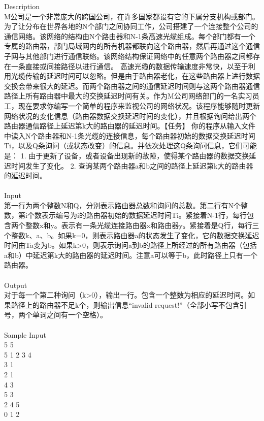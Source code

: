 Description \\
M公司是一个非常庞大的跨国公司，在许多国家都设有它的下属分支机构或部门。为了让分布在世界各地的N个部门之间协同工作，公司搭建了一个连接整个公司的通信网络。该网络的结构由N个路由器和N-1条高速光缆组成。每个部门都有一个专属的路由器，部门局域网内的所有机器都联向这个路由器，然后再通过这个通信子网与其他部门进行通信联络。该网络结构保证网络中的任意两个路由器之间都存在一条直接或间接路径以进行通信。 高速光缆的数据传输速度非常快，以至于利用光缆传输的延迟时间可以忽略。但是由于路由器老化，在这些路由器上进行数据交换会带来很大的延迟。而两个路由器之间的通信延迟时间则与这两个路由器通信路径上所有路由器中最大的交换延迟时间有关。作为M公司网络部门的一名实习员工，现在要求你编写一个简单的程序来监视公司的网络状况。该程序能够随时更新网络状况的变化信息（路由器数据交换延迟时间的变化），并且根据询问给出两个路由器通信路径上延迟第k大的路由器的延迟时间。【任务】 你的程序从输入文件中读入N个路由器和N-1条光缆的连接信息，每个路由器初始的数据交换延迟时间Ti，以及Q条询问（或状态改变）的信息。并依次处理这Q条询问信息，它们可能是： 1. 由于更新了设备，或者设备出现新的故障，使得某个路由器的数据交换延迟时间发生了变化。 2. 查询某两个路由器a和b之间的路径上延迟第k大的路由器的延迟时间。 \\
 \\
Input \\
第一行为两个整数N和Q，分别表示路由器总数和询问的总数。第二行有N个整数，第i个数表示编号为i的路由器初始的数据延迟时间Ti。紧接着N-1行，每行包含两个整数x和y。表示有一条光缆连接路由器x和路由器y。紧接着是Q行，每行三个整数k、a、b。如果k=0，则表示路由器a的状态发生了变化，它的数据交换延迟时间由Ta变为b。如果k>0，则表示询问a到b的路径上所经过的所有路由器（包括a和b）中延迟第k大的路由器的延迟时间。注意a可以等于b，此时路径上只有一个路由器。 \\
 \\
Output \\
对于每一个第二种询问（k>0），输出一行。包含一个整数为相应的延迟时间。如果路径上的路由器不足k个，则输出信息“invalid request!”（全部小写不包含引号，两个单词之间有一个空格）。 \\
 \\
Sample Input \\
5 5 \\
5 1 2 3 4 \\
3 1 \\
2 1 \\
4 3 \\
5 3 \\
2 4 5 \\
0 1 2 \\

